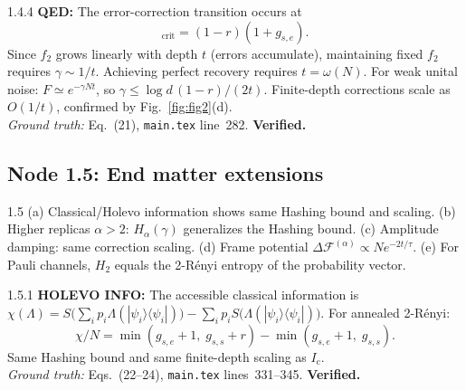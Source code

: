 \documentclass[11pt,a4paper]{article}
\newcommand{\Ic}{I_{\mathrm{c}}}
\begin{document}
\begin{proofnode}{1.4.4}
\textbf{QED:} The error-correction transition occurs at
\begin{equation}
    [f_2]_{\mathrm{crit}} = (1-r)(1+g_{s,e}).
    \label{eq:f2_crit}
\end{equation}
Since $f_2$ grows linearly with depth $t$ (errors accumulate), maintaining fixed $f_2$ requires $\gamma \sim 1/t$. Achieving perfect recovery requires $t = \omega(N)$. For weak unital noise: $F \simeq e^{-\gamma N t}$, so $\gamma \leq \log d\,(1-r)/(2t)$. Finite-depth corrections scale as $O(1/t)$, confirmed by Fig.~\ref{fig:fig2}(d).\\
\textit{Ground truth:} Eq.~(21), \texttt{main.tex} line~282. \textbf{Verified.}
\end{proofnode}

\subsection{Node 1.5: End matter extensions}
\label{sec:node15}

\begin{proofnode}{1.5}
(a) Classical/Holevo information shows same Hashing bound and scaling. (b) Higher replicas $\alpha > 2$: $H_\alpha(\gamma)$ generalizes the Hashing bound. (c) Amplitude damping: same correction scaling. (d) Frame potential $\Delta\mathcal{F}^{(\alpha)} \propto N e^{-2t/\tau}$. (e) For Pauli channels, $H_2$ equals the 2-R\'enyi entropy of the probability vector.
\end{proofnode}

\begin{proofnode}{1.5.1}
\textbf{HOLEVO INFO:} The accessible classical information is $\chi(\Lambda) = S\!\bigl(\sum_i p_i \Lambda(|\psi_i\rangle\langle\psi_i|)\bigr) - \sum_i p_i S\bigl(\Lambda(|\psi_i\rangle\langle\psi_i|)\bigr)$. For annealed 2-R\'enyi:
\begin{equation}
    \chi/N = \min(g_{s,e}+1,\; g_{s,s}+r) - \min(g_{s,e}+1,\; g_{s,s}).
    \label{eq:holevo_RM}
\end{equation}
Same Hashing bound and same finite-depth scaling as $\Ic$.\\
\textit{Ground truth:} Eqs.~(22--24), \texttt{main.tex} lines~331--345. \textbf{Verified.}
\end{proofnode}
\end{document}
